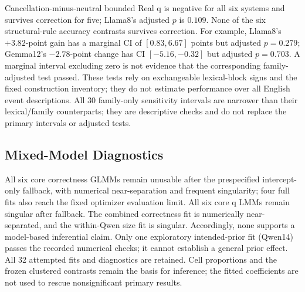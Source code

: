 \documentclass[sigconf,anonymous,review]{acmart}
\begin{document}
Cancellation-minus-neutral bounded Real q is negative for all six systems and survives correction for five; Llama8's adjusted $p$ is $0.109$. None of the six structural-rule accuracy contrasts survives correction. For example, Llama8's $+3.82$-point gain has a marginal CI of $[0.83,6.67]$ points but adjusted $p=0.279$; Gemma12's $-2.78$-point change has CI $[-5.16,-0.32]$ but adjusted $p=0.703$. A marginal interval excluding zero is not evidence that the corresponding family-adjusted test passed. These tests rely on exchangeable lexical-block signs and the fixed construction inventory; they do not estimate performance over all English event descriptions. All 30 family-only sensitivity intervals are narrower than their lexical/family counterparts; they are descriptive checks and do not replace the primary intervals or adjusted tests.

\subsection{Mixed-Model Diagnostics}
All six core correctness GLMMs remain unusable after the prespecified intercept-only fallback, with numerical near-separation and frequent singularity; four full fits also reach the fixed optimizer evaluation limit. All six core q LMMs remain singular after fallback. The combined correctness fit is numerically near-separated, and the within-Qwen size fit is singular. Accordingly, none supports a model-based inferential claim. Only one exploratory intended-prior fit (Qwen14) passes the recorded numerical checks; it cannot establish a general prior effect. All 32 attempted fits and diagnostics are retained. Cell proportions and the frozen clustered contrasts remain the basis for inference; the fitted coefficients are not used to rescue nonsignificant primary results.
\end{document}
